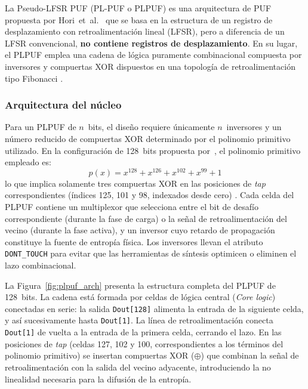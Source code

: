 La Pseudo-LFSR PUF (PL-PUF o PLPUF) es una arquitectura de PUF propuesta
por Hori~et~al.~\cite{hori_2011_pseudolfsr} que se basa en la estructura de
un registro de desplazamiento con retroalimentación lineal (LFSR), pero a
diferencia de un LFSR convencional, \textbf{no contiene registros de
desplazamiento}. En su lugar, el PLPUF emplea una cadena de lógica
puramente combinacional compuesta por inversores y compuertas XOR dispuestos
en una topología de retroalimentación tipo Fibonacci
\cite{hori_2011_pseudolfsr}. 


\subsubsection{Arquitectura del núcleo}

Para un PLPUF de $n$~bits, el diseño requiere únicamente $n$~inversores y un
número reducido de compuertas XOR determinado por el polinomio primitivo
utilizado. En la configuración de 128~bits propuesta
por~\cite{hori_2011_pseudolfsr}, el polinomio primitivo empleado es:
\begin{equation}
  p(x) = x^{128} + x^{126} + x^{102} + x^{99} + 1
  \label{eq:polynomial}
\end{equation}
lo que implica solamente tres compuertas XOR en las posiciones de
\textit{tap} correspondientes (índices 125, 101 y 98, indexados desde cero)
\cite{hori_2011_pseudolfsr}. Cada celda del PLPUF contiene un multiplexor
que selecciona entre el bit de desafío correspondiente (durante la fase de
carga) o la señal de retroalimentación del vecino (durante la fase activa), y
un inversor cuyo retardo de propagación constituye la fuente de entropía
física. Los inversores llevan el atributo \texttt{DONT\_TOUCH} para evitar
que las herramientas de síntesis optimicen o eliminen el lazo
combinacional.

La Figura~\ref{fig:plpuf_arch} presenta la estructura completa del PLPUF de
128~bits. La cadena está formada por celdas de lógica central (\textit{Core
logic}) conectadas en serie: la salida \texttt{Dout[128]} alimenta la entrada
de la siguiente celda, y así sucesivamente hasta \texttt{Dout[1]}. La línea
de retroalimentación conecta \texttt{Dout[1]} de vuelta a la entrada de la
primera celda, cerrando el lazo. En las posiciones de \textit{tap} (celdas
127, 102 y 100, correspondientes a los términos del polinomio primitivo) se
insertan compuertas XOR ($\oplus$) que combinan la señal de
retroalimentación con la salida del vecino adyacente, introduciendo la no
linealidad necesaria para la difusión de la entropía.

